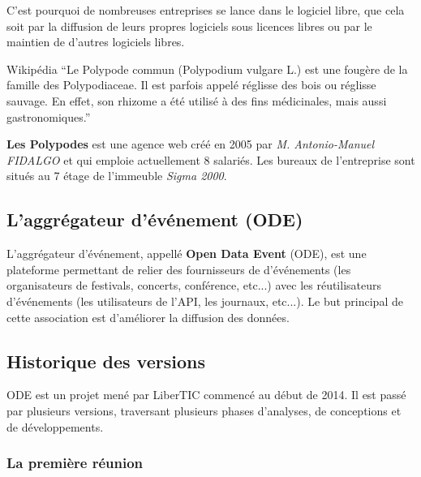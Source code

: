 C'est pourquoi de nombreuses entreprises se lance dans le logiciel libre, que cela soit par la diffusion de leurs propres logiciels sous licences libres ou par le maintien de d'autres logiciels libres.

\begin{aquote}{Wikipédia}
``Le Polypode commun (Polypodium vulgare L.) est une fougère de la famille des Polypodiaceae. Il est parfois appelé réglisse des bois ou réglisse sauvage. En effet, son rhizome a été utilisé à des fins médicinales, mais aussi gastronomiques.''
\end{aquote}

\textbf{Les Polypodes} est une agence web créé en 2005 par \textit{M. Antonio-Manuel FIDALGO} et qui emploie actuellement 8 salariés. Les bureaux de l'entreprise sont situés au 7 étage de l'immeuble \textit{Sigma 2000}.




\subsection{L'aggrégateur d'événement (ODE)}

L'aggrégateur d'événement, appellé \textbf{Open Data Event} (ODE), est une plateforme permettant de relier des fournisseurs de d'événements  (les organisateurs de festivals, concerts, conférence, etc...) avec les réutilisateurs d’événements (les utilisateurs de l’API, les journaux, etc...). Le but principal de cette association est d'améliorer la diffusion des données.


\subsection{Historique des versions}

ODE est un projet mené par LiberTIC commencé au début de 2014. Il est passé par plusieurs versions, traversant plusieurs phases d'analyses, de conceptions et de développements.

\subsubsection*{La première réunion}

